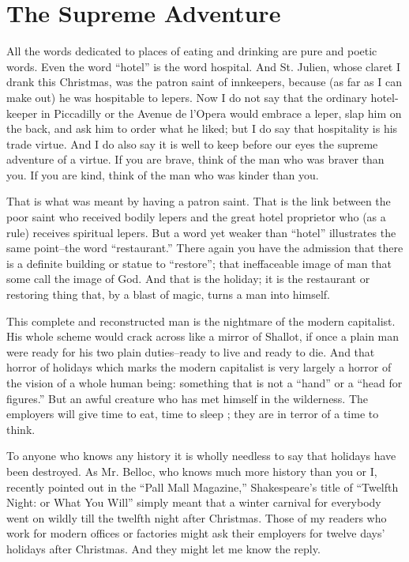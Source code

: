 \documentclass{book}
\begin{document}
\section{The Supreme Adventure}
All the words dedicated to places of eating and drinking are pure and poetic words. Even the word “hotel” is the word hospital. And St. Julien, whose claret I drank this Christmas, was the patron saint of innkeepers, because (as far as I can make out) he was hospitable to lepers. Now I do not say that the ordinary hotel-keeper in Piccadilly or the Avenue de l’Opera would embrace a leper, slap him on the back, and ask him to order what he liked; but I do say that hospitality is his trade virtue. And I do also say it is well to keep before our eyes the supreme adventure of a virtue. If you are brave, think of the man who was braver than you. If you are kind, think of the man who was kinder than you.

That is what was meant by having a patron saint. That is the link between the poor saint who received bodily lepers and the great hotel proprietor who (as a rule) receives spiritual lepers. But a word yet weaker than “hotel” illustrates the same point–the word “restaurant.” There again you have the admission that there is a definite building or statue to “restore”; that ineffaceable image of man that some call the image of God. And that is the holiday; it is the restaurant or restoring thing that, by a blast of magic, turns a man into himself.

This complete and reconstructed man is the nightmare of the modern capitalist. His whole scheme would crack across like a mirror of Shallot, if once a plain man were ready for his two plain duties–ready to live and ready to die. And that horror of holidays which marks the modern capitalist is very largely a horror of the vision of a whole human being: something that is not a “hand” or a “head for figures.” But an awful creature who has met himself in the wilderness. The employers will give time to eat, time to sleep ; they are in terror of a time to think.

To anyone who knows any history it is wholly needless to say that holidays have been destroyed. As Mr. Belloc, who knows much more history than you or I, recently pointed out in the “Pall Mall Magazine,” Shakespeare’s title of “Twelfth Night: or What You Will” simply meant that a winter carnival for everybody went on wildly till the twelfth night after Christmas. Those of my readers who work for modern offices or factories might ask their employers for twelve days’ holidays after Christmas. And they might let me know the reply.
\end{document}
